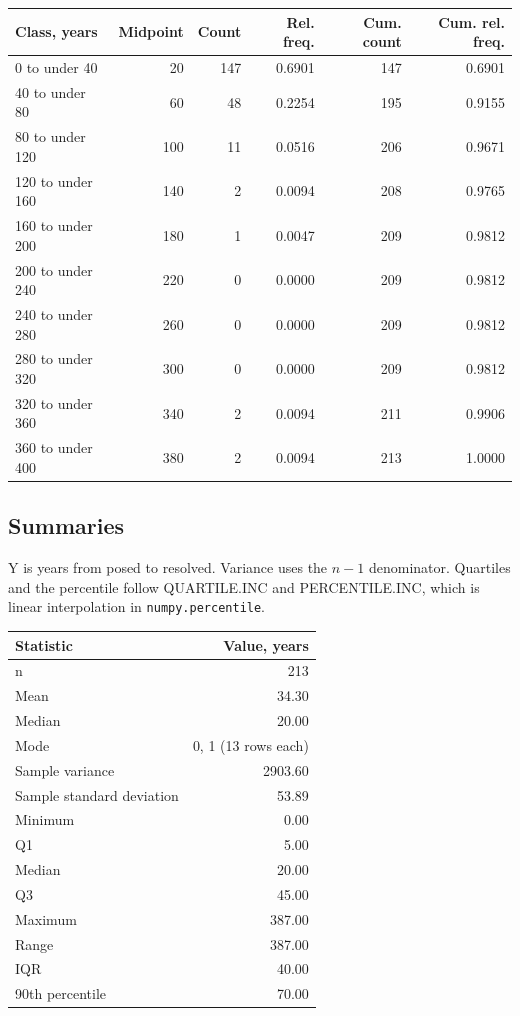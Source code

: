\documentclass[11pt]{article}
\begin{document}
\begin{center}\begin{tabular}{lrrrrr}
\toprule
Class, years & Midpoint & Count & Rel. freq. & Cum. count & Cum. rel. freq. \\
\midrule
0 to under 40 & 20 & 147 & 0.6901 & 147 & 0.6901 \\
40 to under 80 & 60 & 48 & 0.2254 & 195 & 0.9155 \\
80 to under 120 & 100 & 11 & 0.0516 & 206 & 0.9671 \\
120 to under 160 & 140 & 2 & 0.0094 & 208 & 0.9765 \\
160 to under 200 & 180 & 1 & 0.0047 & 209 & 0.9812 \\
200 to under 240 & 220 & 0 & 0.0000 & 209 & 0.9812 \\
240 to under 280 & 260 & 0 & 0.0000 & 209 & 0.9812 \\
280 to under 320 & 300 & 0 & 0.0000 & 209 & 0.9812 \\
320 to under 360 & 340 & 2 & 0.0094 & 211 & 0.9906 \\
360 to under 400 & 380 & 2 & 0.0094 & 213 & 1.0000 \\
\bottomrule
\end{tabular}\end{center}

\subsection{Summaries}

Y is years from posed to resolved. Variance uses the $n - 1$ denominator. Quartiles and the percentile follow QUARTILE.INC and PERCENTILE.INC, which is linear interpolation in \texttt{numpy.percentile}.

\begin{center}\begin{tabular}{lr}
\toprule
Statistic & Value, years \\
\midrule
n & 213 \\
Mean & 34.30 \\
Median & 20.00 \\
Mode & 0, 1 (13 rows each) \\
Sample variance & 2903.60 \\
Sample standard deviation & 53.89 \\
Minimum & 0.00 \\
Q1 & 5.00 \\
Median & 20.00 \\
Q3 & 45.00 \\
Maximum & 387.00 \\
Range & 387.00 \\
IQR & 40.00 \\
90th percentile & 70.00 \\
\bottomrule
\end{tabular}\end{center}
\end{document}
